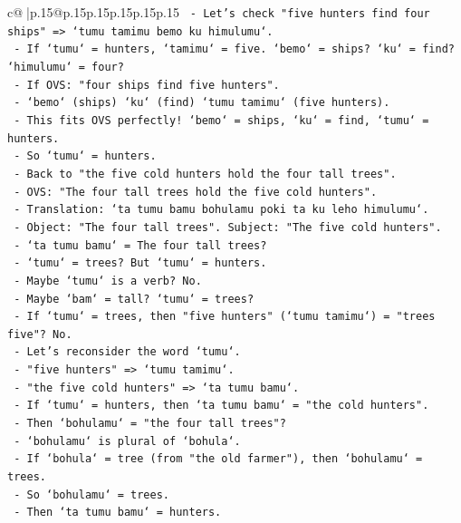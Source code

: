 \documentclass{article}
\begin{document}
{\begin{supertabular}{c@{$\;$}|p{.15\linewidth}@{}p{.15\linewidth}p{.15\linewidth}p{.15\linewidth}p{.15\linewidth}p{.15\linewidth}}
{{{\texttt{    {-} Let's check "five hunters find four ships" => `tumu tamimu bemo ku himulumu`.} \\
\texttt{      {-} If `tumu` = hunters, `tamimu` = five. `bemo` = ships? `ku` = find? `himulumu` = four?} \\
\texttt{      {-} If OVS: "four ships find five hunters".} \\
\texttt{      {-} `bemo` (ships) `ku` (find) `tumu tamimu` (five hunters).} \\
\texttt{      {-} This fits OVS perfectly! `bemo` = ships, `ku` = find, `tumu` = hunters.} \\
\texttt{    {-} So `tumu` = hunters.} \\
\texttt{    {-} Back to "the five cold hunters hold the four tall trees".} \\
\texttt{      {-} OVS: "The four tall trees hold the five cold hunters".} \\
\texttt{      {-} Translation: `ta tumu bamu bohulamu poki ta ku leho himulumu`.} \\
\texttt{      {-} Object: "The four tall trees". Subject: "The five cold hunters".} \\
\texttt{      {-} `ta tumu bamu` = The four tall trees?} \\
\texttt{        {-} `tumu` = trees? But `tumu` = hunters.} \\
\texttt{        {-} Maybe `tumu` is a verb? No.} \\
\texttt{        {-} Maybe `bam` = tall? `tumu` = trees?} \\
\texttt{        {-} If `tumu` = trees, then "five hunters" (`tumu tamimu`) = "trees five"? No.} \\
\texttt{      {-} Let's reconsider the word `tumu`.} \\
\texttt{      {-} "five hunters" => `tumu tamimu`.} \\
\texttt{      {-} "the five cold hunters" => `ta tumu bamu`.} \\
\texttt{      {-} If `tumu` = hunters, then `ta tumu bamu` = "the cold hunters".} \\
\texttt{      {-} Then `bohulamu` = "the four tall trees"?} \\
\texttt{      {-} `bohulamu` is plural of `bohula`.} \\
\texttt{      {-} If `bohula` = tree (from "the old farmer"), then `bohulamu` = trees.} \\
\texttt{      {-} So `bohulamu` = trees.} \\
\texttt{      {-} Then `ta tumu bamu` = hunters.} \\
}}}
\end{supertabular}}
\end{document}
